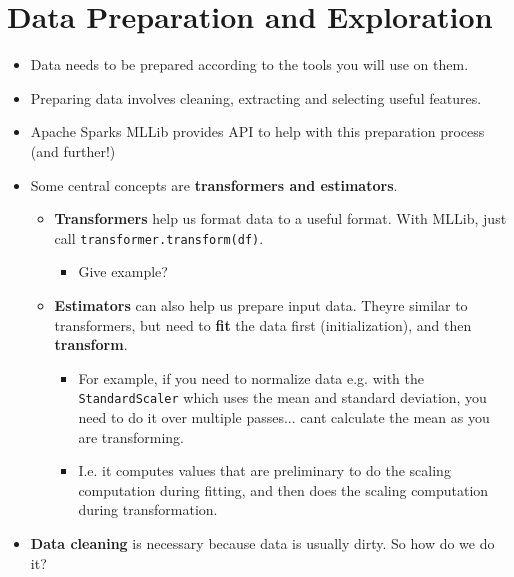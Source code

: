 
\section{Data Preparation and Exploration}
\begin{itemize}
\item
  Data needs to be prepared according to the tools you will use on them.
\item
  Preparing data involves cleaning, extracting and selecting useful
  features.
\item
  Apache Spark\textquotesingle s MLLib provides API to help with this
  preparation process (and further!)
\item
  Some central concepts are \textbf{transformers and estimators}.

  \begin{itemize}
    \item
    \textbf{Transformers} help us format data to a useful format. With
    MLLib, just call \texttt{transformer.transform(df)}.

    \begin{itemize}
        \item
      Give example?
    \end{itemize}
  \item
    \textbf{Estimators} can also help us prepare input data.
    They\textquotesingle re similar to transformers, but need to
    \textbf{fit} the data first (initialization), and then
    \textbf{transform}.

    \begin{itemize}
        \item
      For example, if you need to normalize data e.g. with the
      \texttt{StandardScaler} which uses the mean and standard
      deviation, you need to do it over multiple passes...
      can\textquotesingle t calculate the mean as you are transforming.
    \item
      I.e. it computes values that are preliminary to do the scaling
      computation during fitting, and then does the scaling computation
      during transformation.
    \end{itemize}
  \end{itemize}
\item
  \textbf{Data cleaning} is necessary because data is usually dirty. So
  how do we do it?


\end{itemize}
